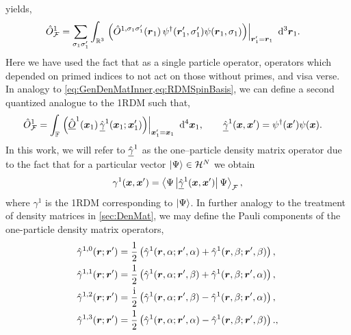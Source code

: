 yields,
\begin{align}
  &\hat{O}_{\mathcal{F}}^1 = \sum_{\sigma_1\sigma'_1}\int_{\mathbb R^3} 
    \left.\left(\hat{O}^{1,\sigma_1\sigma'_1} (\boldsymbol{r}_1) \, \psi^\dagger(\boldsymbol{r}'_1,\sigma'_1) \psi(\boldsymbol{r}_1,\sigma_1) \right) \right\vert_{\boldsymbol{r}'_1 = \boldsymbol{r}_1 } 
    \,\,\mathrm{d}^3 \boldsymbol{r}_1. 
\end{align}
Here we have used the fact that as a single particle operator, operators which depended on primed indices to not act on those
without primes, and visa verse. In analogy to \cref{eq:GenDenMatInner,eq:RDMSpinBasis}, we can define a second quantized analogue to
the 1RDM such that,
\begin{align}
  \label{eq:DenOpInner}
  &\hat{O}_{\mathcal{F}}^1 = \int_{\mathbb F} 
    \left.\left(\hat{\underline{O}}^{1} (\boldsymbol{x}_1) \, \hat{\underline{\gamma}}^1(\boldsymbol{x}_1; \boldsymbol{x}'_1) \right) \right\vert_{\boldsymbol{x}'_1 = \boldsymbol{x}_1 } 
    \,\,\mathrm{d}^4 \boldsymbol{x}_1, \qquad \hat{\underline{\gamma}}^1(\boldsymbol{x},\boldsymbol{x}') = \psi^\dagger(\boldsymbol{x}') \psi(\boldsymbol{x}).
\end{align}
In this work, we will refer to $\hat{\underline{\gamma}}^1$ as the one--particle density matrix operator due to the fact that for
a particular vector $\left\vert \Psi \right\rangle \in \mathcal{H}^N$ we obtain
\begin{equation}
\label{eq:DenMatOpRelation}
\gamma^1(\boldsymbol{x},\boldsymbol{x}') = \left\langle \Psi \left\vert \hat{\underline{\gamma}}^1(\boldsymbol{x},\boldsymbol{x}') \right\vert \Psi \right\rangle_{\mathcal{F}},
\end{equation}
where $\gamma^1$ is the 1RDM corresponding to $\left\vert \Psi \right\rangle$. In further analogy to the treatment of density
matrices in \cref{sec:DenMat}, we may define the Pauli components of the one-particle density matrix operators,
\begin{subequations}
  \label{eq:PauliDenMatOp}
\begin{align}
  &\hat{\gamma}^{1,0}(\boldsymbol{r};\boldsymbol{r}') = \frac{1}{2}   \left(\hat{\gamma}^1{}(\boldsymbol{r},\alpha;\boldsymbol{r}',\alpha) + \hat{\gamma}^1(\boldsymbol{r},\beta; \boldsymbol{r}',\beta )\right) , \\
  &\hat{\gamma}^{1,1}(\boldsymbol{r};\boldsymbol{r}') = \frac{1}{2}   \left(\hat{\gamma}^1{}(\boldsymbol{r},\alpha;\boldsymbol{r}',\beta ) + \hat{\gamma}^1(\boldsymbol{r},\beta; \boldsymbol{r}',\alpha)\right) , \\
  &\hat{\gamma}^{1,2}(\boldsymbol{r};\boldsymbol{r}') = \frac{\mathrm i}{2} \left(\hat{\gamma}^1{}(\boldsymbol{r},\alpha;\boldsymbol{r}',\beta ) - \hat{\gamma}^1(\boldsymbol{r},\beta; \boldsymbol{r}',\alpha)\right) , \\
  &\hat{\gamma}^{1,3}(\boldsymbol{r};\boldsymbol{r}') = \frac{1}{2}   \left(\hat{\gamma}^1{}(\boldsymbol{r},\alpha;\boldsymbol{r}',\alpha) - \hat{\gamma}^1(\boldsymbol{r},\beta; \boldsymbol{r}',\beta )\right) .,
\end{align}
\end{subequations}
